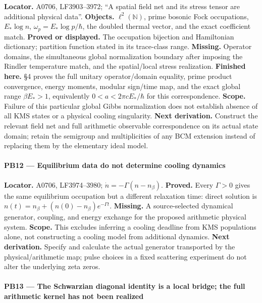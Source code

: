 \documentclass[10pt,a4paper,oneside]{report}
\begin{document}
\textbf{Locator.} A0706, LF3903--3972; ``A spatial field net and its
stress tensor are additional physical data''. \textbf{Objects.}
\(\ell^2(\mathbb N)\), prime bosonic Fock occupations, \(E_*\log n\),
\(\omega_p=E_*\log p/\hbar\), the doubled thermal vector, and the exact
coefficient match. \textbf{Proved or displayed.} The occupation
bijection and Hamiltonian dictionary; partition function stated in its
trace-class range. \textbf{Missing.} Operator domains, the simultaneous
global normalization boundary after imposing the Rindler temperature
match, and the spatial/local stress realization. \textbf{Finished here.}
\protect{} §4 proves the full unitary
operator/domain equality, prime product convergence, energy moments,
modular sign/time map, and the exact global range \(\beta E_*>1\),
equivalently \(0<a<2\pi cE_*/\hbar\) for this correspondence.
\textbf{Scope.} Failure of this particular global Gibbs normalization
does not establish absence of all KMS states or a physical cooling
singularity. \textbf{Next derivation.} Construct the relevant field net
and full arithmetic observable correspondence on its actual state
domain; retain the semigroup and multiplicities of any BCM extension
instead of replacing them by the elementary ideal model.

\paragraph{PB12 --- Equilibrium data do not determine cooling
dynamics}\label{pb12-equilibrium-data-do-not-determine-cooling-dynamics}

\textbf{Locator.} A0706, LF3974--3980; \(\dot n=-\Gamma(n-n_\beta)\).
\textbf{Proved.} Every \(\Gamma>0\) gives the same equilibrium
occupation but a different relaxation time: direct solution is
\(n(t)=n_\beta+(n(0)-n_\beta)e^{-\Gamma t}\). \textbf{Missing.} A
source-selected dynamical generator, coupling, and energy exchange for
the proposed arithmetic physical system. \textbf{Scope.} This excludes
inferring a cooling deadline from KMS populations alone, not
constructing a cooling model from additional dynamics. \textbf{Next
derivation.} Specify and calculate the actual generator transported by
the physical/arithmetic map; pulse choices in a fixed scattering
experiment do not alter the underlying zeta zeros.

\paragraph{PB13 --- The Schwarzian diagonal identity is a local bridge;
the full arithmetic kernel has not been
realized}\label{pb13-the-schwarzian-diagonal-identity-is-a-local-bridge-the-full-arithmetic-kernel-has-not-been-realized}
\end{document}
